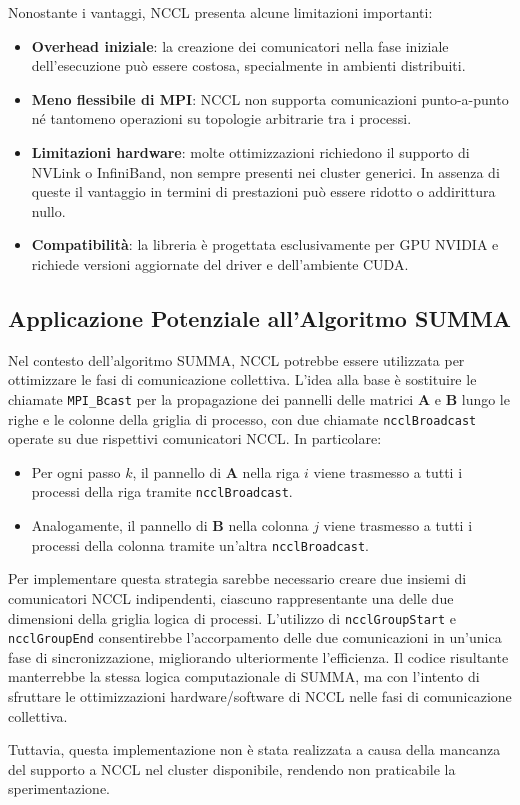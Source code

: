 Nonostante i vantaggi, NCCL presenta alcune limitazioni importanti:

\begin{itemize}
    \item \textbf{Overhead iniziale}: la creazione dei comunicatori nella fase iniziale dell'esecuzione può essere costosa, specialmente in ambienti distribuiti.
    \item \textbf{Meno flessibile di MPI}: NCCL non supporta comunicazioni punto-a-punto né tantomeno operazioni su topologie arbitrarie tra i processi.
    \item \textbf{Limitazioni hardware}: molte ottimizzazioni richiedono il supporto di NVLink o InfiniBand, non sempre presenti nei cluster generici. In assenza di queste il vantaggio in termini di prestazioni può essere ridotto o addirittura nullo.
    \item \textbf{Compatibilità}: la libreria è progettata esclusivamente per GPU NVIDIA e richiede versioni aggiornate del driver e dell’ambiente CUDA.
\end{itemize}

\subsection{Applicazione Potenziale all’Algoritmo SUMMA}

Nel contesto dell’algoritmo SUMMA, NCCL potrebbe essere utilizzata per ottimizzare le fasi di comunicazione collettiva.
L’idea alla base è sostituire le chiamate \texttt{MPI\_Bcast} per la propagazione dei pannelli delle matrici $\mathbf{A}$ e $\mathbf{B}$ lungo le righe e le colonne della griglia di processo, con due chiamate \texttt{ncclBroadcast} operate su due rispettivi comunicatori NCCL. In particolare:

\begin{itemize}
    \item Per ogni passo $k$, il pannello di $\mathbf{A}$ nella riga $i$ viene trasmesso a tutti i processi della riga tramite \texttt{ncclBroadcast}.
    \item Analogamente, il pannello di $\mathbf{B}$ nella colonna $j$ viene trasmesso a tutti i processi della colonna tramite un’altra \texttt{ncclBroadcast}.
\end{itemize}

Per implementare questa strategia sarebbe necessario creare due insiemi di comunicatori NCCL indipendenti, ciascuno rappresentante una delle due dimensioni della griglia logica di processi. L’utilizzo di \texttt{ncclGroupStart} e \texttt{ncclGroupEnd} consentirebbe l’accorpamento delle due comunicazioni in un’unica fase di sincronizzazione, migliorando ulteriormente l'efficienza.
Il codice risultante manterrebbe la stessa logica computazionale di SUMMA, ma con l'intento di sfruttare le ottimizzazioni hardware/software di NCCL nelle fasi di comunicazione collettiva.

Tuttavia, questa implementazione non è stata realizzata a causa della mancanza del supporto a NCCL nel cluster disponibile, rendendo non praticabile la sperimentazione.
